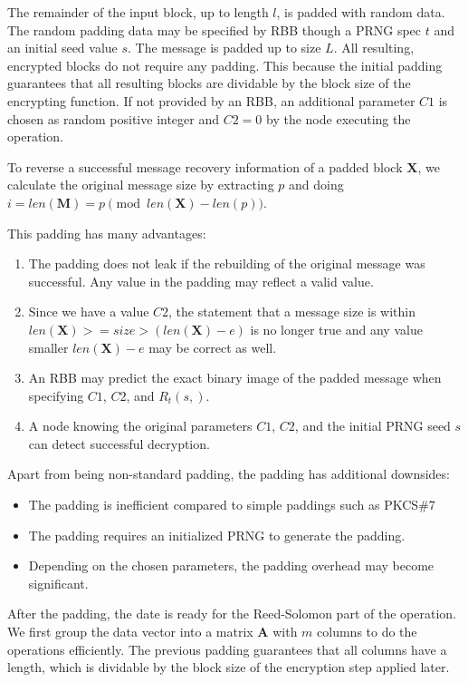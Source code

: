 The remainder of the input block, up to length $l$, is padded with random data. The random padding data may be specified by RBB though a PRNG spec $t$ and an initial seed value $s$. The message is padded up to size $L$. All resulting, encrypted blocks do not require any padding. This because the initial padding guarantees that all resulting blocks are dividable by the block size of the encrypting function. If not provided by an RBB, an additional parameter $C1$ is chosen as random positive integer and $C2=0$  by the node executing the operation.

To reverse a successful message recovery information of a padded block $\mathbf{X}$, we calculate the original message size by extracting $p$ and doing $i=len(\mathbf{M})=p \pmod{ len\left(\mathbf{X}\right)-len\left(p\right) }$.

This padding has many advantages:
\begin{enumerate}
	\item The padding does not leak if the rebuilding of the original message was successful. Any value in the padding may reflect a valid value.
	\item Since we have a value $C2$, the statement that a message size is within $len(\mathbf{X})>=size>(len(\mathbf{X})-e)$ is no longer true and any value smaller $len(\mathbf{X})-e$ may be correct as well.
	\item An RBB may predict the exact binary image of the padded message when specifying $C1$, $C2$, and $R_{t}(s,)$.
	\item A node knowing the original parameters $C1$, $C2$, and the initial PRNG seed $s$ can detect successful decryption.
\end{enumerate}

Apart from being non-standard padding, the padding has additional downsides:
\begin{itemize}
	\item The padding is inefficient compared to simple paddings such as PKCS\#7
	\item The padding requires an initialized PRNG to generate the padding.
	\item Depending on the chosen parameters, the padding overhead may become significant. 
\end{itemize}

After the padding, the date is ready for the Reed-Solomon part of the operation. We first group the data vector into a matrix $\mathbf{A}$ with $m$ columns to do the operations efficiently. The previous padding guarantees that all columns have a length, which is dividable by the block size of the encryption step applied later.

